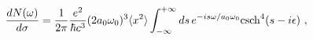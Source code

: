 \begin{equation}\label{ct99-11}
\frac{dN(\omega)}{d\sigma}=\frac{1}{2\pi}\frac{e^2}{\hbar c^3}(2a_0\omega _0)^3\langle x^2\rangle\int _{-\infty}^{+\infty}ds\, e^{-is\omega/a_0\omega _0 }{\rm csch}^4 (s-i\epsilon)~,
\end{equation}

